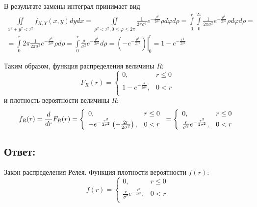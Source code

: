 В результате замены интеграл принимает вид
\begin{multline}
    \iint \limits_{x^2 + y^2 < r^2} f_{X,Y}(x, y) dy dx
    = \iint \limits_{\rho^2 < r^2, 0 \le \varphi \le 2 \pi} \frac{1}{2 \pi \sigma^2} e^{- \frac{\rho^2}{2 \sigma^2}} \rho d \varphi d \rho
    = \int \limits_0^{r} \int \limits_0^{2 \pi} \frac{1}{2 \pi \sigma^2} e^{- \frac{\rho^2}{2 \sigma^2}} \rho d \varphi d \rho = \\
    = \int \limits_0^{r} 2 \pi \frac{1}{2 \pi \sigma^2} e^{- \frac{\rho^2}{2 \sigma^2}} \rho d \rho
    = \int \limits_0^{r} \frac{\rho}{\sigma^2} e^{- \frac{\rho^2}{2 \sigma^2}} d \rho
    = \left . \left ( - e^{- \frac{\rho^2}{2 \sigma^2}} \right ) \right |_0^{r}
    = 1 - e^{-\frac{r^2}{2 \sigma^2}}
\end{multline}

Таким образом, функция распределения величины $R$:
\begin{equation}
    F_R(r)
    = \left \{
    \begin{array}{ll}
        0,                               & r \le 0 \\
        1 - e^{-\frac{r^2}{2 \sigma^2}}, & 0 < r   \\
    \end{array}
    \right .
\end{equation}
и плотность вероятности величины $R$:
\begin{equation}
    f_R(r)
    = \frac{d}{dr} F_R(r)
    = \left \{
    \begin{array}{ll}
        0,                                                                       & r \le 0 \\
        - e^{-\frac{r^2}{2 \sigma^2}} \left ( - \frac{2 r}{2 \sigma^2} \right ), & 0 < r   \\
    \end{array}
    \right .
    = \left \{
    \begin{array}{ll}
        0,                                              & r \le 0 \\
        \frac{r}{\sigma^2} e^{-\frac{r^2}{2 \sigma^2}}, & 0 < r   \\
    \end{array}
    \right .
\end{equation}
\subsection*{Ответ:}
Закон распределения Релея. Функция плотности вероятности $f(r)$:
$$
f(r)
= \left \{
\begin{array}{ll}
    0,                                              & r \le 0 \\
    \frac{r}{\sigma^2} e^{-\frac{r^2}{2 \sigma^2}}, & 0 < r   \\
\end{array}
\right .
$$


